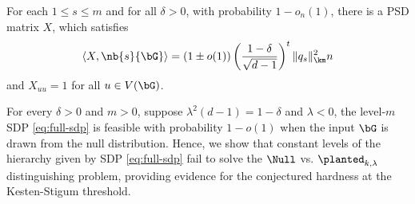 
\begin{theorem} \label{thm:lower-bound}
	For each $1\le s\le m$ and for all $\delta > 0$, with probability $1-o_n(1)$, there is a PSD matrix $X$, which satisfies
	\[
		\langle X,\nb{s}{\bG} \rangle = (1\pm o(1)) \left(\frac{1-\delta}{\sqrt{d-1}}\right)^{t} \|q_s\|^2_{\km}n
	\]
	and $X_{uu} = 1$ for all $u\in V(\bG)$.
\end{theorem}

\begin{remark}
For every $\delta > 0$ and $m > 0$, suppose $\lambda^2(d-1)=1-\delta$ and $\lambda < 0$, the level-$m$  SDP \eqref{eq:full-sdp} is feasible with probability $1-o(1)$ when the input $\bG$ is drawn from the null distribution.  Hence, we show that constant levels of the hierarchy given by SDP \eqref{eq:full-sdp} fail to solve the $\Null$ vs. $\planted_{k,\lambda}$ distinguishing problem, providing evidence for the conjectured hardness at the Kesten-Stigum threshold.
\end{remark}











